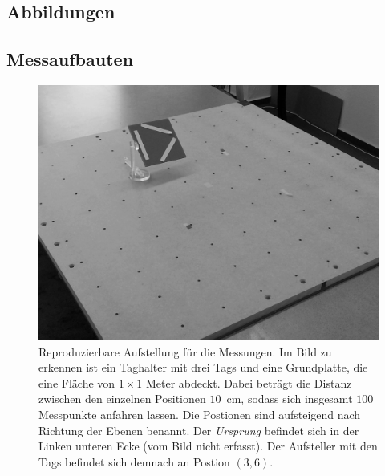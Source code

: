 %
%
%
\begin{appendix}
\normalsize
%
\chapter{Abbildungen}
\section{Messaufbauten}
\begin{figure}[h!]
 \centering
         \includegraphics[width=\textwidth]{img/Calibration_Plate1.png}
         \caption[PRPS-Kalibiersystem]{Reproduzierbare Aufstellung für die Messungen. Im Bild zu erkennen ist ein Taghalter mit drei Tags und eine Grundplatte, die eine Fläche von $1\times1$ Meter abdeckt. Dabei beträgt die Distanz zwischen den einzelnen Positionen $10$~cm, sodass sich insgesamt $100$ Messpunkte anfahren lassen. Die Postionen sind aufsteigend nach Richtung der Ebenen benannt. Der \textit{Ursprung} befindet sich in der Linken unteren Ecke (vom Bild nicht erfasst). Der Aufsteller mit den Tags befindet sich demnach an Postion $(3,6)$.}
         \label{fig:Spider1}
\end{figure}
\newpage
%
\begin{figure}[h!]
 \centering

\end{figure}
\end{appendix}
